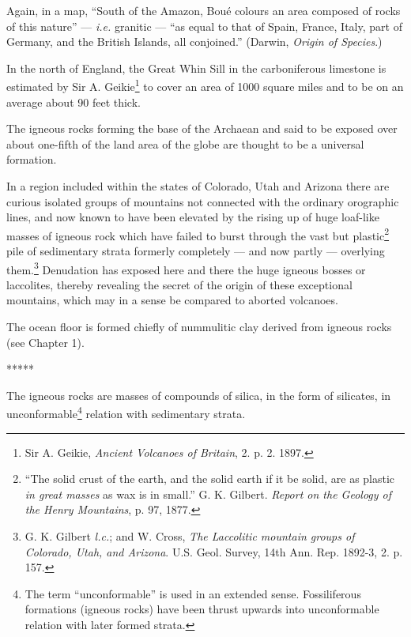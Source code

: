 \documentclass[a4paper, 12pt, oneside, landscape]{article}
\begin{document}
Again, in a map, ``South of the Amazon, Boué colours an area composed of rocks of this nature'' --- \emph{i.e.} granitic --- ``as equal to that of Spain, France, Italy, part of Germany, and the British Islands, all conjoined.'' (Darwin, \emph{Origin of Species}.)

In the north of England, the Great Whin Sill in the carboniferous limestone is estimated by Sir A. Geikie\footnote{Sir A. Geikie, \emph{Ancient Volcanoes of Britain}, 2. p. 2. 1897.} to cover an area of 1000 square miles and to be on an average about 90 feet thick.

The igneous rocks forming the base of the Archaean and said to be exposed over about one-fifth of the land area of the globe are thought to be a universal formation.

In a region included within the states of Colorado, Utah and Arizona there are curious isolated groups of mountains not connected with the ordinary orographic lines, and now known to have been elevated by the rising up of huge loaf-like masses of igneous rock which have failed to burst through the vast but plastic\footnote{``The solid crust of the earth, and the solid earth if it be solid, are as plastic \emph{in great masses} as wax is in small.'' G. K. Gilbert. \emph{Report on the Geology of the Henry Mountains}, p. 97, 1877.} pile of sedimentary strata formerly completely --- and now partly --- overlying them.\footnote{G. K. Gilbert \emph{l.c.}; and W. Cross, \emph{The Laccolitic mountain groups of Colorado, Utah, and Arizona}. U.S. Geol. Survey, 14th Ann. Rep. 1892-3, 2. p. 157.} Denudation has exposed here and there the huge igneous bosses or laccolites, thereby revealing the secret of the origin of these exceptional mountains, which may in a sense be compared to aborted volcanoes.

The ocean floor is formed chiefly of nummulitic clay derived from igneous rocks (see Chapter 1).

\centerline{*\hspace{15mm}*\hspace{15mm}*\hspace{15mm}*\hspace{15mm}*}
\bigskip

The igneous rocks are masses of compounds of silica, in the form of silicates, in unconformable\footnote{The term ``unconformable'' is used in an extended sense. Fossiliferous formations (igneous rocks) have been thrust upwards into unconformable relation with later formed strata.} relation with sedimentary strata.
\end{document}
